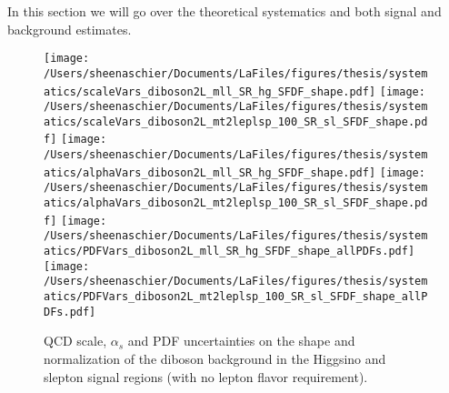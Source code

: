 \documentclass[11pt, oneside]{article}   	%
\begin{document}
In this section we will go over the theoretical systematics and both signal and background estimates.
 \begin{figure}
  \centering
  \texttt{[image: /Users/sheenaschier/Documents/LaFiles/figures/thesis/systematics/scaleVars\_diboson2L\_mll\_SR\_hg\_SFDF\_shape.pdf]}
  \texttt{[image: /Users/sheenaschier/Documents/LaFiles/figures/thesis/systematics/scaleVars\_diboson2L\_mt2leplsp\_100\_SR\_sl\_SFDF\_shape.pdf]}
 \texttt{[image: /Users/sheenaschier/Documents/LaFiles/figures/thesis/systematics/alphaVars\_diboson2L\_mll\_SR\_hg\_SFDF\_shape.pdf]}
 \texttt{[image: /Users/sheenaschier/Documents/LaFiles/figures/thesis/systematics/alphaVars\_diboson2L\_mt2leplsp\_100\_SR\_sl\_SFDF\_shape.pdf]}
  \texttt{[image: /Users/sheenaschier/Documents/LaFiles/figures/thesis/systematics/PDFVars\_diboson2L\_mll\_SR\_hg\_SFDF\_shape\_allPDFs.pdf]}
  \texttt{[image: /Users/sheenaschier/Documents/LaFiles/figures/thesis/systematics/PDFVars\_diboson2L\_mt2leplsp\_100\_SR\_sl\_SFDF\_shape\_allPDFs.pdf]}
 \caption{QCD scale, $\alpha_{s}$ and PDF uncertainties on the shape and normalization of the diboson background in the Higgsino and slepton signal regions (with no lepton flavor requirement).}
\label{fig:theoryUncsVV}
 \end{figure}
 
\end{document}
